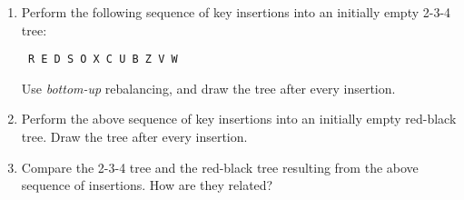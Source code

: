 \begin{enumerate}

\item  Perform the following sequence of key insertions into an
  initially empty 2-3-4 tree:
  \begin{center} \tt
        R E D S O X C U B Z V W
  \end{center}
  Use {\em bottom-up} rebalancing, and draw the tree after every
  insertion.
  
\item  Perform the above sequence of key insertions into an initially
  empty red-black tree.  Draw the tree after every insertion.
  
\item  Compare the 2-3-4 tree and the red-black tree resulting from the
  above sequence of insertions.  How are they related?

\end{enumerate}

